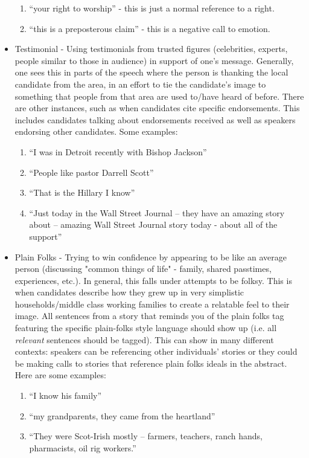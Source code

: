 \documentclass[letterpaper]{article}
\begin{document}
\begin{itemize}
	\begin{enumerate}
		\item ``your right to worship'' - this is just a normal reference to a right.
		\item ``this is a preposterous claim'' - this is a negative call to emotion.
	\end{enumerate}
	\item Testimonial - Using testimonials from trusted figures (celebrities, experts, people similar to those in audience) in support of one's message. Generally, one sees this in parts of the speech where the person is thanking the local candidate from the area, in an effort to tie the candidate's image to something that people from that area are used to/have heard of before. There are other instances, such as when candidates cite specific endorsements. This includes candidates talking about endorsements received as well as speakers endorsing other candidates. Some examples:
	\begin{enumerate}
		\item ``I was in Detroit recently with Bishop Jackson''
		\item ``People like pastor Darrell Scott''
		\item ``That is the Hillary I know''
		\item ``Just today in the Wall Street Journal – they have an amazing story about – amazing Wall Street Journal story today - about all of the support''
	\end{enumerate}
	\item Plain Folks - Trying to win confidence by appearing to be like an average person (discussing "common things of life" - family, shared passtimes, experiences, etc.). In general, this falls under attempts to be folksy. This is when candidates describe how they grew up in very simplistic households/middle class working families to create a relatable feel to their image. All sentences from a story that reminds you of the plain folks tag featuring the specific plain-folks style language should show up (i.e. all \emph{relevant} sentences should be tagged). This can show in many different contexts: speakers can be referencing other individuals' stories or they could be making calls to stories that reference plain folks ideals in the abstract. Here are some examples:
	\begin{enumerate}
		\item ``I know his family''
		\item ``my grandparents, they came from the heartland''
		\item ``They were Scot-Irish mostly – farmers, teachers, ranch hands, pharmacists, oil rig workers.''

\end{enumerate}
\end{itemize}
\end{document}
